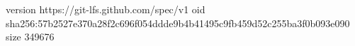 version https://git-lfs.github.com/spec/v1
oid sha256:57b2527e370a28f2c696f054ddde9b4b41495c9fb459d52c255ba3f0b093e090
size 349676
